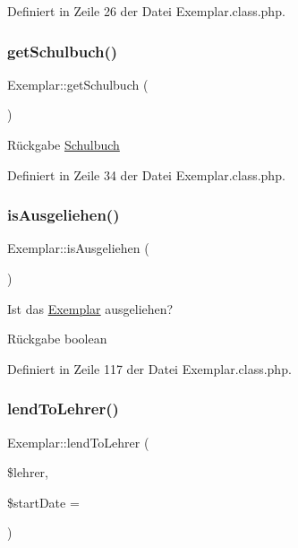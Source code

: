 Definiert in Zeile 26 der Datei Exemplar.\+class.\+php.

\mbox{\label{class_exemplar_ad9c9b96e2cf33d90d90b72badf93ce0d}} 
\subsubsection{\texorpdfstring{get\+Schulbuch()}{getSchulbuch()}}
{\footnotesize\ttfamily Exemplar\+::get\+Schulbuch (\begin{DoxyParamCaption}{ }\end{DoxyParamCaption})}

\begin{DoxyReturn}{Rückgabe}
\mbox{\hyperlink{class_schulbuch}{Schulbuch}} 
\end{DoxyReturn}


Definiert in Zeile 34 der Datei Exemplar.\+class.\+php.

\mbox{\label{class_exemplar_a0a8ec58fdeaf08fafbbaf75e04b8d8e4}} 
\subsubsection{\texorpdfstring{is\+Ausgeliehen()}{isAusgeliehen()}}
{\footnotesize\ttfamily Exemplar\+::is\+Ausgeliehen (\begin{DoxyParamCaption}{ }\end{DoxyParamCaption})}

Ist das \mbox{\hyperlink{class_exemplar}{Exemplar}} ausgeliehen? \begin{DoxyReturn}{Rückgabe}
boolean 
\end{DoxyReturn}


Definiert in Zeile 117 der Datei Exemplar.\+class.\+php.

\mbox{\label{class_exemplar_a58d65f4745f391fa885d6094357ac08e}} 
\subsubsection{\texorpdfstring{lend\+To\+Lehrer()}{lendToLehrer()}}
{\footnotesize\ttfamily Exemplar\+::lend\+To\+Lehrer (\begin{DoxyParamCaption}\item[{}]{\$lehrer,  }\item[{}]{\$start\+Date = {\ttfamily \textquotesingle{}\textquotesingle{}} }\end{DoxyParamCaption})}


